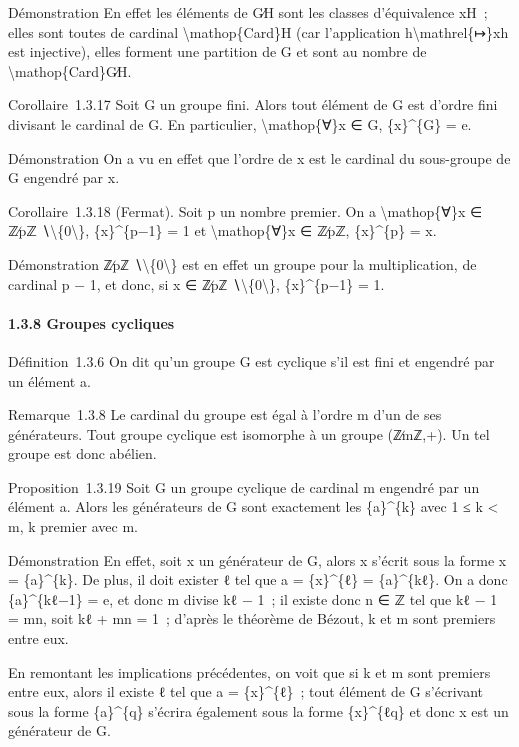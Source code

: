 \documentclass[]{article}
\begin{document}
Démonstration En effet les éléments de G∕H sont les classes
d'équivalence xH~; elles sont toutes de cardinal
\textbackslash{}mathop\{Card\}H (car l'application
h\textbackslash{}mathrel\{↦\}xh est injective), elles forment une
partition de G et sont au nombre de \textbackslash{}mathop\{Card\}G∕H.

Corollaire~1.3.17 Soit G un groupe fini. Alors tout élément de G est
d'ordre fini divisant le cardinal de G. En particulier,
\textbackslash{}mathop\{∀\}x ∈ G, \{x\}\^{}\{\textbar{}G\textbar{}\} =
e.

Démonstration On a vu en effet que l'ordre de x est le cardinal du
sous-groupe de G engendré par x.

Corollaire~1.3.18 (Fermat). Soit p un nombre premier. On a
\textbackslash{}mathop\{∀\}x ∈ ℤ∕pℤ
∖\textbackslash{}\{0\textbackslash{}\}, \{x\}\^{}\{p−1\} = 1 et
\textbackslash{}mathop\{∀\}x ∈ ℤ∕pℤ, \{x\}\^{}\{p\} = x.

Démonstration ℤ∕pℤ ∖\textbackslash{}\{0\textbackslash{}\} est en effet
un groupe pour la multiplication, de cardinal p − 1, et donc, si x ∈
ℤ∕pℤ ∖\textbackslash{}\{0\textbackslash{}\}, \{x\}\^{}\{p−1\} = 1.

\paragraph{1.3.8 Groupes cycliques}

Définition~1.3.6 On dit qu'un groupe G est cyclique s'il est fini et
engendré par un élément a.

Remarque~1.3.8 Le cardinal du groupe est égal à l'ordre m d'un de ses
générateurs. Tout groupe cyclique est isomorphe à un groupe (ℤ∕mℤ,+). Un
tel groupe est donc abélien.

Proposition~1.3.19 Soit G un groupe cyclique de cardinal m engendré par
un élément a. Alors les générateurs de G sont exactement les
\{a\}\^{}\{k\} avec 1 ≤ k \textless{} m, k premier avec m.

Démonstration En effet, soit x un générateur de G, alors x s'écrit sous
la forme x = \{a\}\^{}\{k\}. De plus, il doit exister ℓ tel que a =
\{x\}\^{}\{ℓ\} = \{a\}\^{}\{kℓ\}. On a donc \{a\}\^{}\{kℓ−1\} = e, et
donc m divise kℓ − 1~; il existe donc n ∈ ℤ tel que kℓ − 1 = mn, soit kℓ
+ mn = 1~; d'après le théorème de Bézout, k et m sont premiers entre
eux.

En remontant les implications précédentes, on voit que si k et m sont
premiers entre eux, alors il existe ℓ tel que a = \{x\}\^{}\{ℓ\}~; tout
élément de G s'écrivant sous la forme \{a\}\^{}\{q\} s'écrira également
sous la forme \{x\}\^{}\{ℓq\} et donc x est un générateur de G.
\end{document}
